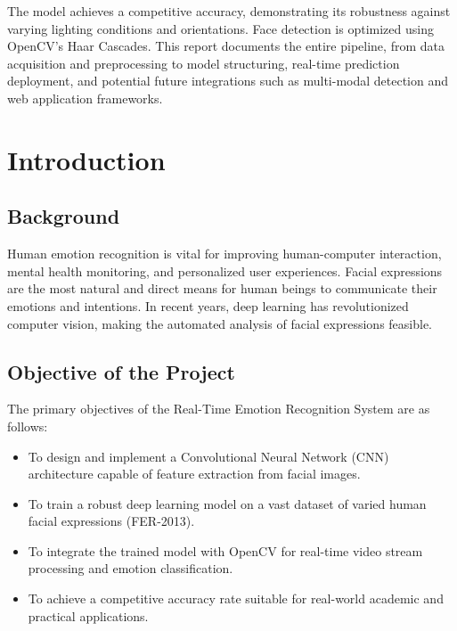 \documentclass[12pt,a4paper]{report}
\begin{document}
The model achieves a competitive accuracy, demonstrating its robustness against varying lighting conditions and orientations. Face detection is optimized using OpenCV's Haar Cascades. This report documents the entire pipeline, from data acquisition and preprocessing to model structuring, real-time prediction deployment, and potential future integrations such as multi-modal detection and web application frameworks.

\newpage
\tableofcontents

\newpage
{}
\listoffigures

\newpage
{}
\listoftables

\clearpage
{}

\chapter{Introduction}

\section{Background}
Human emotion recognition is vital for improving human-computer interaction, mental health monitoring, and personalized user experiences. Facial expressions are the most natural and direct means for human beings to communicate their emotions and intentions. In recent years, deep learning has revolutionized computer vision, making the automated analysis of facial expressions feasible.

\lipsum[1-3] %

\section{Objective of the Project}
The primary objectives of the Real-Time Emotion Recognition System are as follows:
\begin{itemize}
    \item To design and implement a Convolutional Neural Network (CNN) architecture capable of feature extraction from facial images.
    \item To train a robust deep learning model on a vast dataset of varied human facial expressions (FER-2013).
    \item To integrate the trained model with OpenCV for real-time video stream processing and emotion classification.
    \item To achieve a competitive accuracy rate suitable for real-world academic and practical applications.
\end{itemize}
\end{document}
